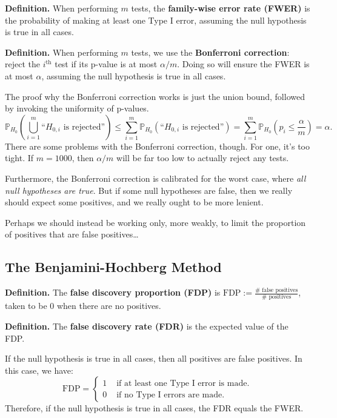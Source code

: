 \textbf{Definition.}
When performing $m$ tests,
the \textbf{family-wise error rate (FWER)}
is the probability of making at least one Type I error,
assuming the null hypothesis is true in all cases.

\textbf{Definition.}
When performing $m$ tests,
we use the \textbf{Bonferroni correction}:
reject the $i^{\text{th}}$ test
if its p-value is at most $\alpha/m$.
Doing so will ensure the FWER is at most $\alpha$,
assuming the null hypothesis is true in all cases.

The proof why the Bonferroni correction works
is just the union bound, followed by
invoking the uniformity of p-values.
\[
\mathbb{P}_{H_0}\left(
    \bigcup_{i = 1}^m \text{``}H_{0, i} \text{ is rejected}\text{''}
\right)
\leq \sum_{i = 1}^m \mathbb{P}_{H_0}\left(
    \text{``}H_{0, i} \text{ is rejected}\text{''}
\right)
= \sum_{i = 1}^m \mathbb{P}_{H_0}\left(
    p_i \leq \frac{\alpha}{m}
\right)
= \alpha.
\]
There are some problems with the Bonferroni correction, though.
For one, it's too tight.
If $m = 1000$, then $\alpha / m$ will be far too low
to actually reject any tests.

Furthermore, the Bonferroni correction
is calibrated for the worst case, where
\emph{all null hypotheses are true}.
But if some null hypotheses are false,
then we really should expect some positives,
and we really ought to be more lenient.

Perhaps we should instead be working only,
more weakly, to limit the proportion of positives
that are false positives\dots

\subsection{The Benjamini-Hochberg Method}

\textbf{Definition.}
The \textbf{false discovery proportion (FDP)} is
$\text{FDP} := \frac{\# \text{ false positives}}{\# \text{ positives}}$,
taken to be $0$ when there are no positives.

\textbf{Definition.}
The \textbf{false discovery rate (FDR)} is
the expected value of the FDP.

\begin{remark}
    If the null hypothesis is true in all cases,
    then all positives are false positives.
    In this case, we have:
    \[ \text{FDP} = \begin{cases}
    1 & \text{ if at least one Type I error is made.} \\
    0 & \text{ if no Type I errors are made.}
    \end{cases} \]
    Therefore, if the null hypothesis is true in all cases,
    the FDR equals the FWER.
\end{remark}

